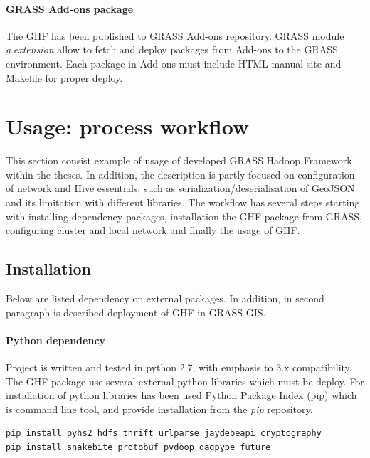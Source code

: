 \documentclass[a4paper,12pt,oneside]{report}
\begin{document}
	\paragraph{GRASS Add-ons package} The GHF has been published to GRASS Add-ons
	repository. GRASS module \textit{g.extension} allow to fetch and deploy packages
	from Add-ons to the GRASS environment. Each package in Add-ons must include HTML
	manual site and Makefile for proper deploy. 
	
	
	
	\section{Usage: process workflow}\label{sec:usage_spatial}
	This section consist example of usage of developed GRASS Hadoop Framework within
	the theses. In addition, the description is partly focused on configuration of
	network and Hive essentials, such as serialization/deserialisation of GeoJSON
	and its limitation with different libraries. The workflow has several steps
	starting with installing dependency packages, installation the GHF package
	from GRASS, configuring cluster and local network and finally the usage of GHF.
	
	
	\subsection{Installation}
	Below are listed  dependency on external packages. In addition, in second
	paragraph is described deployment of GHF in GRASS GIS. 
	\paragraph{Python dependency}
	Project is written and tested in python 2.7, with emphasis to 3.x compatibility.
	The GHF package use several external python libraries which must be deploy. For
	installation of python libraries has been used Python Package Index (pip) which
	is command line tool, and provide installation from the \textit{pip} repository.
	\begin{footnotesize}
		\begin{lstlisting}[style=python]
pip install pyhs2 hdfs thrift urlparse jaydebeapi cryptography
pip install snakebite protobuf pydoop dagpype future
		\end{lstlisting}
	\end{footnotesize}
	
	
\end{document}
